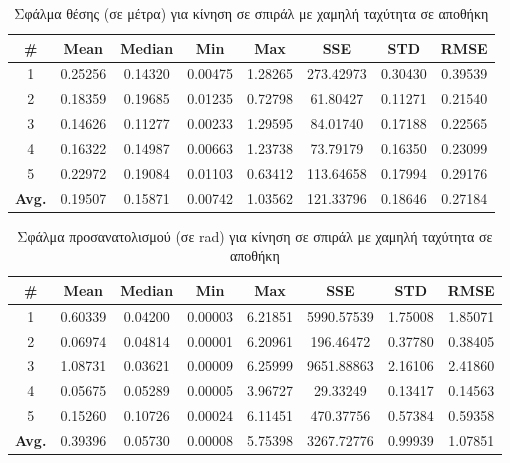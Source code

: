 \begin{table}[H]
    \begin{center}
        \centering
        \caption{Σφάλμα θέσης (σε μέτρα) για κίνηση σε σπιράλ με χαμηλή ταχύτητα σε αποθήκη}
        \label{tab:position_error_spiral_slow_warehouse}
        \begin{tabular}{| c | c | c | c | c | c | c | c | }
        \hline
        \rowcolor{Gray}
        \# & Mean & Median & Min & Max & SSE & STD & RMSE \\
        \hline
        1 & 0.25256 & 0.14320 & 0.00475 & 1.28265 & 273.42973 & 0.30430 & 0.39539 \\
        2 & 0.18359 & 0.19685 & 0.01235 & 0.72798 & 61.80427 & 0.11271 & 0.21540 \\
        3 & 0.14626 & 0.11277 & 0.00233 & 1.29595 & 84.01740 & 0.17188 & 0.22565 \\
        4 & 0.16322 & 0.14987 & 0.00663 & 1.23738 & 73.79179 & 0.16350 & 0.23099 \\
        5 & 0.22972 & 0.19084 & 0.01103 & 0.63412 & 113.64658 & 0.17994 & 0.29176 \\
        \hline
        \textbf{Avg.} & 0.19507 & 0.15871 & 0.00742 & 1.03562 & 121.33796 & 0.18646 & 0.27184 \\
        \hline
        \end{tabular}
    \end{center}
\end{table}

\begin{table}[H]
    \begin{center}
        \centering
        \caption{Σφάλμα προσανατολισμού (σε rad) για κίνηση σε σπιράλ με χαμηλή ταχύτητα σε αποθήκη}
        \label{tab:orientation_error_spiral_slow_warehouse}
        \begin{tabular}{| c | c | c | c | c | c | c | c | }
        \hline
        \rowcolor{Gray}
        \# & Mean & Median & Min & Max & SSE & STD & RMSE \\
        \hline
        1 & 0.60339 & 0.04200 & 0.00003 & 6.21851 & 5990.57539 & 1.75008 & 1.85071 \\
        2 & 0.06974 & 0.04814 & 0.00001 & 6.20961 & 196.46472 & 0.37780 & 0.38405 \\
        3 & 1.08731 & 0.03621 & 0.00009 & 6.25999 & 9651.88863 & 2.16106 & 2.41860 \\
        4 & 0.05675 & 0.05289 & 0.00005 & 3.96727 & 29.33249 & 0.13417 & 0.14563 \\
        5 & 0.15260 & 0.10726 & 0.00024 & 6.11451 & 470.37756 & 0.57384 & 0.59358 \\
        \hline
        \textbf{Avg.} & 0.39396 & 0.05730 & 0.00008 & 5.75398 & 3267.72776 & 0.99939 & 1.07851 \\
        \hline
        \end{tabular}
    \end{center}
\end{table}

